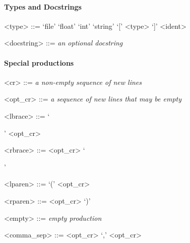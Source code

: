 \paragraph{Types and Docstrings}

\begin{grammar}
  <type> ::= `file'
  \alt `float'
  \alt `int'
  \alt `string'
  \alt `[' <type> `]'
  \alt <ident>

  <docstring> ::= \emph{an optional docstring}
\end{grammar}


\paragraph{Special productions}

\begin{grammar}
  <cr> ::= \emph{a non-empty sequence of new lines}

  <opt_cr> ::= \emph{a sequence of new lines that may be empty}

  <lbrace> ::= `{' <opt_cr>

  <rbrace> ::= <opt_cr> `}'

  <lparen> ::= `(' <opt_cr>

  <rparen> ::= <opt_cr> `)'

  <empty> ::= \emph{empty production}

  <comma_sep> ::= <opt_cr> `,' <opt_cr>
\end{grammar}
